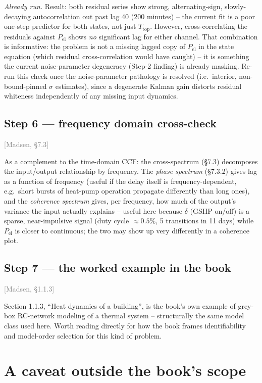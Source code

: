 \documentclass[11pt]{article}
\newcommand{\madsen}[1]{\textcolor{gray}{[Madsen, \S#1]}}
\begin{document}
\emph{Already run.} Result: both residual series show strong, alternating-sign,
slowly-decaying autocorrelation out past lag 40 (200 minutes) -- the current
fit is a poor one-step predictor for both states, not just $T_{\text{top}}$.
However, cross-correlating the residuals against $P_{\text{el}}$ shows
\emph{no} significant lag for either channel. That combination is
informative: the problem is not a missing lagged copy of $P_{\text{el}}$ in
the state equation (which residual cross-correlation would have caught) --
it is something the current noise-parameter degeneracy (Step-2 finding) is
already masking. Re-run this check once the noise-parameter pathology is
resolved (i.e.\ interior, non-bound-pinned $\sigma$ estimates), since a
degenerate Kalman gain distorts residual whiteness independently of any
missing input dynamics.

\subsection*{Step 6 --- frequency domain cross-check} \madsen{7.3}

As a complement to the time-domain CCF: the cross-spectrum
(\S7.3) decomposes the input/output relationship by frequency. The
\emph{phase spectrum} (\S7.3.2) gives lag as a function of frequency
(useful if the delay itself is frequency-dependent, e.g.\ short bursts of
heat-pump operation propagate differently than long ones), and the
\emph{coherence spectrum} gives, per frequency, how much of the output's
variance the input actually explains -- useful here because $\delta$ (GSHP
on/off) is a sparse, near-impulsive signal (duty cycle $\approx 0.5\%$,
5 transitions in 11 days) while $P_{\text{el}}$ is closer to continuous; the
two may show up very differently in a coherence plot.

\subsection*{Step 7 --- the worked example in the book} \madsen{1.1.3}

Section 1.1.3, ``Heat dynamics of a building'', is the book's own example of
grey-box RC-network modeling of a thermal system -- structurally the same
model class used here. Worth reading directly for how the book frames
identifiability and model-order selection for this kind of problem.

\section{A caveat outside the book's scope}
\label{sec:caveat}
\end{document}
